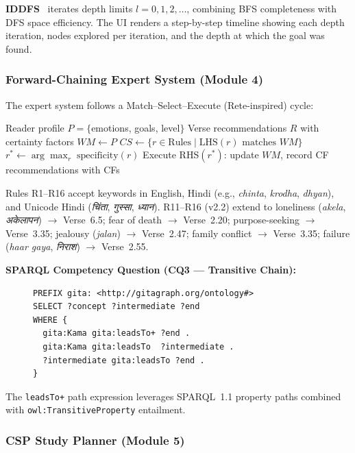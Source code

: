 \documentclass[conference]{IEEEtran}
\newcommand{\hi}[1]{{\hindifont #1}}
\begin{document}
\textbf{IDDFS}~\cite{korf1985depth} iterates depth limits $l = 0, 1, 2,\ldots$,
combining BFS completeness with DFS space efficiency. The UI renders a
step-by-step timeline showing each depth iteration, nodes explored per
iteration, and the depth at which the goal was found.

\subsubsection{Forward-Chaining Expert System (Module 4)}

The expert system follows a Match--Select--Execute (Rete-inspired) cycle:

\begin{algorithmic}
\REQUIRE Reader profile $P = \{$emotions, goals, level$\}$
\ENSURE Verse recommendations $R$ with certainty factors
\STATE $WM \leftarrow P$
\REPEAT
  \STATE $CS \leftarrow \{r \in \text{Rules} \mid \text{LHS}(r) \text{ matches } WM\}$
    \STATE $r^* \leftarrow \arg\max_r\;\text{specificity}(r)$
    \STATE Execute RHS$(r^*)$: update $WM$, record CF
  \ENDIF
{}
\RETURN recommendations with CFs
\end{algorithmic}

Rules R1--R16 accept keywords in English, Hindi (e.g., \textit{chinta},
\textit{krodha}, \textit{dhyan}), and Unicode Hindi (\textit{\hi{चिंता}},
\textit{\hi{गुस्सा}}, \textit{\hi{ध्यान}}). R11--R16 (v2.2) extend to
loneliness (\textit{akela}, \textit{\hi{अकेलापन}}) $\to$ Verse~6.5;
fear of death $\to$ Verse~2.20; purpose-seeking $\to$ Verse~3.35;
jealousy (\textit{jalan}) $\to$ Verse~2.47; family conflict $\to$ Verse~3.35;
failure (\textit{haar gaya}, \textit{\hi{निराश}}) $\to$ Verse~2.55.

\textbf{SPARQL Competency Question (CQ3 — Transitive Chain):}
\begin{figure}[!t]
\begin{lstlisting}[language=SPARQL, caption={CQ3: Desire downfall chain via transitivity}]
PREFIX gita: <http://gitagraph.org/ontology#>
SELECT ?concept ?intermediate ?end
WHERE {
  gita:Kama gita:leadsTo+ ?end .
  gita:Kama gita:leadsTo  ?intermediate .
  ?intermediate gita:leadsTo ?end .
}
\end{lstlisting}
\end{figure}
The \texttt{leadsTo+} path expression leverages SPARQL~1.1 property paths
combined with \texttt{owl:TransitiveProperty} entailment.

\subsubsection{CSP Study Planner (Module 5)}
\end{document}
